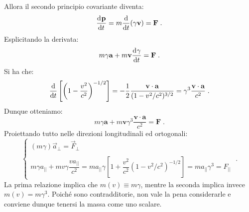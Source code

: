 Allora il secondo principio covariante diventa:
\begin{equation}
\frac{\mathrm{d}^{}\mathbf{p}}{\mathrm{d}t^{}}=m\frac{\mathrm{d}}{\mathrm{d}{t}}(\gamma\mathbf{v})=\mathbf{F}\;.
\end{equation}
Esplicitando la derivata:
\begin{equation}
m\gamma\mathbf{a}+m\mathbf{v}\frac{\mathrm{d}^{}\gamma}{\mathrm{d}t^{}}=\mathbf{F}\;.
\end{equation}
Si ha che:
\begin{equation}
\frac{\mathrm{d}}{\mathrm{d}{t}}\left[\left(1-\frac{v^2}{c^2}\right)^{-1/2}\right]=-\frac{1}{2}\frac{\mathbf{v}\cdot\mathbf{a}}{(1-v^2/c^2)^{3/2}}=\gamma^3\frac{\mathbf{v}\cdot\mathbf{a}}{c^2}\;.
\end{equation}
Dunque otteniamo:
\begin{equation}
m\gamma\mathbf{a}+m\mathbf{v}\gamma^3\frac{\mathbf{v}\cdot\mathbf{a}}{c^2}=\mathbf{F}\;.
\end{equation}
Proiettando tutto nelle direzioni longitudinali ed ortogonali:
\begin{equation}
\begin{cases}
 (m\gamma)\vec{a}_{\perp}=\vec{F}_{\perp} \\
\\
m\gamma a_{||}+mv\gamma\dfrac{va_{||}}{c^2}=ma_{||}\gamma\left[1+\dfrac{v^2}{c^2}(1-v^2/c^2)^{-1/2}\right]=ma_{||}\gamma^3= F_{||}
\end{cases}\;.
\end{equation}
La prima relazione implica che $m(v)\equiv m\gamma$, mentre la seconda implica invece $m(v)=m\gamma^3$. Poiché sono contradditorie, non vale la pena considerarle e conviene dunque tenersi la massa come uno scalare.
